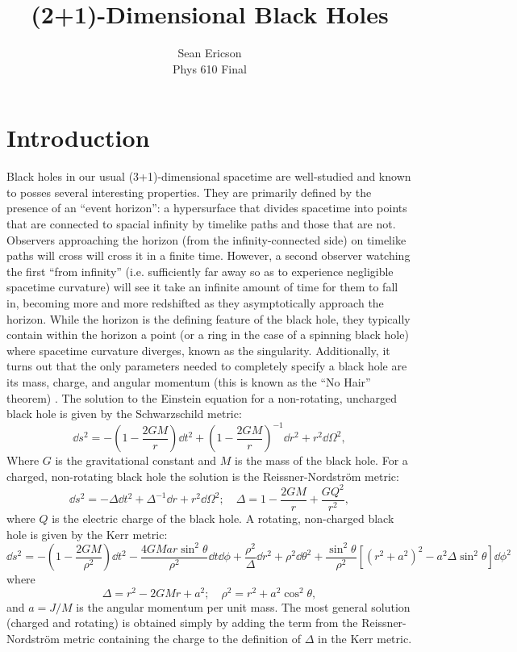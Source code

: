 \documentclass[12pt]{article}
\begin{document}
\title{(2+1)-Dimensional Black Holes}
\author{Sean Ericson \\ Phys 610 Final}
\maketitle

\section{Introduction}
Black holes in our usual (3+1)-dimensional spacetime are well-studied and known to posses several interesting properties. They are primarily defined by the presence of an ``event horizon'': a hypersurface that divides spacetime into points that are connected to spacial infinity by timelike paths and those that are not. Observers approaching the horizon (from the infinity-connected side) on timelike paths will cross will cross it in a finite time. However, a second observer watching the first ``from infinity'' (i.e. sufficiently far away so as to experience negligible spacetime curvature) will see it take an infinite amount of time for them to fall in, becoming more and more redshifted as they asymptotically approach the horizon. While the horizon is the defining feature of the black hole, they typically contain within the horizon a point (or a ring in the case of a spinning black hole) where spacetime curvature diverges, known as the singularity. Additionally, it turns out that the only parameters needed to completely specify a black hole are its mass, charge, and angular momentum (this is known as the ``No Hair'' theorem) \cite{carroll}. The solution to the Einstein equation for a non-rotating, uncharged black hole is given by the Schwarzschild metric:
\begin{equation}
    \dd s^2 = -\left(1-\frac{2GM}{r}\right)\dd t^2 + \left(1-\frac{2GM}{r}\right)^{-1} \dd r^2 + r^2 \dd\Omega^2,
\end{equation}
Where $G$ is the gravitational constant and $M$ is the mass of the black hole. For a charged, non-rotating black hole the solution is the Reissner-Nordstr{\"o}m metric:
\begin{equation}
    \dd s^2 = -\Delta \dd t^2 + \Delta^{-1}\dd r + r^2 \dd\Omega^2; \quad \Delta = 1 - \frac{2GM}{r} + \frac{GQ^2}{r^2},
\end{equation}
where $Q$ is the electric charge of the black hole. A rotating, non-charged black hole is given by the Kerr metric:
\begin{equation}
    \dd s^2 = -\left(1 - \frac{2GM}{\rho^2}\right)\dd t^2 - \frac{4GMar\sin^2\theta}{\rho^2}\dd t \dd \phi + \frac{\rho^2}{\Delta}\dd r^2 + \rho^2 \dd \theta^2 + \frac{\sin^2\theta}{\rho^2}\left[(r^2 + a^2)^2 - a^2\Delta\sin^2\theta\right]\dd\phi^2
\end{equation}
where 
\[ \Delta = r^2 - 2GMr + a^2; \quad \rho^2 = r^2 + a^2\cos^2\theta, \]
and $a = J/M$ is the angular momentum per unit mass. The most general solution (charged and rotating) is obtained simply by adding the term from the Reissner-Nordstr{\"o}m metric containing the charge to the definition of $\Delta$ in the Kerr metric.
\end{document}
